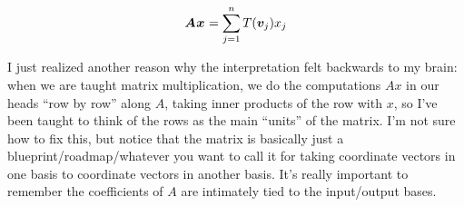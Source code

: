 \documentclass[11pt]{article}
\begin{document}
\begin{align}
	\matr A \vec x = \jnsum T(\vec[j]{v}) x_j
\end{align}

I just realized another reason why the interpretation felt backwards to my brain: when we are taught matrix multiplication, we do the computations $Ax$ in our heads ``row by row'' along $A$, taking inner products of the row with $x$, so I've been taught to think of the rows as the main ``units'' of the matrix. I'm not sure how to fix this, but notice that the matrix is basically just a blueprint/roadmap/whatever you want to call it for taking coordinate vectors in one basis to coordinate vectors in another basis. It's really important to remember the coefficients of $A$ are intimately tied to the input/output bases.  \\
\end{document}
